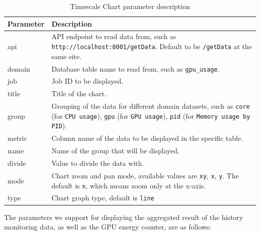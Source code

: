 \begin{table}[H]
\centering
\caption{Timescale Chart parameter description}
\begin{tabular}{|l|p{10cm}|}
\hline
\textbf{Parameter} & \textbf{Description} \\ \hline
api & API endpoint to read data from, such as \texttt{http://localhost:8001/getData}. Default to be \texttt{/getData} at the same site. \\ \hline
domain & Database table name to read from, such as \texttt{gpu\_usage}. \\ \hline
job & Job ID to be displayed. \\ \hline
title & Title of the chart. \\ \hline
group & Grouping of the data for different domain datasets, such as \texttt{core} (for \texttt{CPU usage}), \texttt{gpu} (for \texttt{GPU usage}), \texttt{pid} (for \texttt{Memory usage by PID}). \\ \hline
metric & Column name of the data to be displayed in the specific table. \\ \hline
name & Name of the group that will be displayed. \\ \hline
divide & Value to divide the data with. \\ \hline
mode & Chart zoom and pan mode, available values are \texttt{xy}, \texttt{x}, \texttt{y}. The default is \texttt{x}, which means zoom only at the x-axis. \\ \hline
type & Chart graph type, default is \texttt{line} \\ \hline
\end{tabular}
\label{tab:chart_params}
\end{table}

The parameters we support for displaying the aggregated result of the history monitoring data, as well as the GPU energy counter, are as follows:

